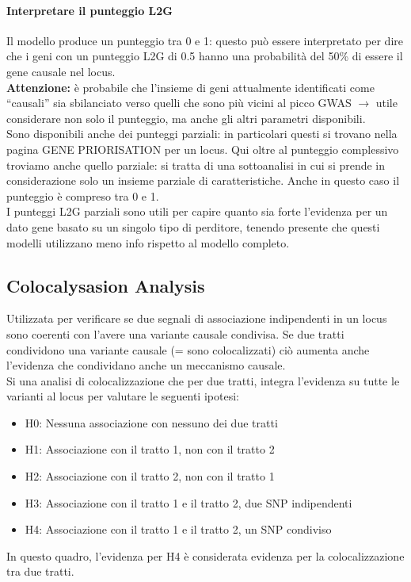 \documentclass{article}
\begin{document}
\paragraph{Interpretare il punteggio L2G}
Il modello produce un punteggio tra 0 e 1: questo può essere interpretato per dire che i geni con un punteggio L2G di 0.5 hanno una probabilità del 50\% di essere il gene causale nel locus.\\
\textbf{Attenzione:} è probabile che l'insieme di geni attualmente identificati come “causali” sia sbilanciato verso quelli che sono più vicini al picco GWAS $\rightarrow$ utile considerare non solo il punteggio, ma anche gli altri parametri disponibili.\\
Sono disponibili anche dei punteggi parziali: in particolari questi si trovano nella pagina GENE PRIORISATION per un locus. Qui oltre al punteggio complessivo troviamo anche quello parziale: si
tratta di una sottoanalisi in cui si prende in considerazione solo un insieme parziale di caratteristiche. Anche in questo caso il punteggio è compreso tra 0 e 1.\\
I punteggi L2G parziali sono utili per capire quanto sia forte l'evidenza per un dato gene basato su un singolo tipo di perditore, tenendo presente che questi modelli utilizzano meno info rispetto al modello completo.

\subsection{Colocalysasion Analysis}
Utilizzata per verificare se due segnali di associazione indipendenti in un locus sono coerenti con l'avere una variante causale condivisa. Se due tratti condividono una variante causale (= sono colocalizzati) ciò aumenta anche l'evidenza che condividano anche un meccanismo causale.\\
Si una analisi di colocalizzazione che per due tratti, integra l'evidenza su tutte le varianti al locus per valutare le seguenti ipotesi:
\begin{itemize}
    \item H0: Nessuna associazione con nessuno dei due tratti
    \item H1: Associazione con il tratto 1, non con il tratto 2
    \item H2: Associazione con il tratto 2, non con il tratto 1
    \item H3: Associazione con il tratto 1 e il tratto 2, due SNP indipendenti
    \item H4: Associazione con il tratto 1 e il tratto 2, un SNP condiviso
\end{itemize}
In questo quadro, l'evidenza per H4 è considerata evidenza per la colocalizzazione tra due tratti.
\end{document}

